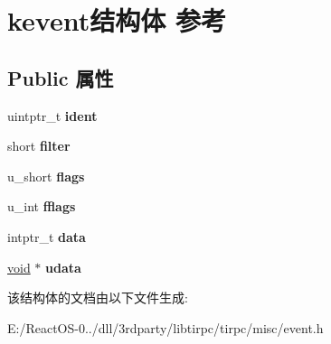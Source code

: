 \hypertarget{structkevent}{}\section{kevent结构体 参考}
\label{structkevent}
\subsection*{Public 属性}
\begin{DoxyCompactItemize}
\item 
\mbox{\label{structkevent_ac0b32ec224ff8ed9aa0f2cd9fec408e2}} 
uintptr\+\_\+t {\bfseries ident}
\item 
\mbox{\label{structkevent_acf52dd1251b947adf79ed58850b1e214}} 
short {\bfseries filter}
\item 
\mbox{\label{structkevent_a33b925e59d34198e994fe2a710dcfe65}} 
u\+\_\+short {\bfseries flags}
\item 
\mbox{\label{structkevent_a4fe638c29a4068235d7373fb2b86e209}} 
u\+\_\+int {\bfseries fflags}
\item 
\mbox{\label{structkevent_a3cbb448d7fb791adef63ff14b11e7e97}} 
intptr\+\_\+t {\bfseries data}
\item 
\mbox{\label{structkevent_a4b863201999be15a2fdeefb0abe4e716}} 
\hyperlink{interfacevoid}{void} $\ast$ {\bfseries udata}
\end{DoxyCompactItemize}


该结构体的文档由以下文件生成\+:\begin{DoxyCompactItemize}
\item 
E\+:/\+React\+O\+S-\/0../dll/3rdparty/libtirpc/tirpc/misc/event.\+h\end{DoxyCompactItemize}
